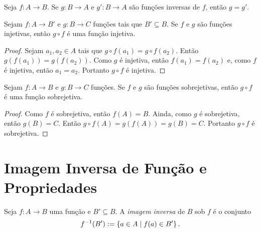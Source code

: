 \begin{prop}
	Seja $f: A \to B$. Se $g: B \to A$ e $g': B \to A$ são funções inversas de $f$, então $g=g'$.
\end{prop}
	

\begin{prop}
\label{prop:comp.func.inj}
	Sejam $f: A \to B'$ e $g: B \to C$ funções tais que $B' \subseteq B$. Se $f$ e $g$ são funções injetivas, então $g \circ f$ é uma função injetiva.
\end{prop}
\begin{proof}
	Sejam $a_1,a_2 \in A$ tais que $g \circ f(a_1)=g \circ f(a_2)$. Então $g(f(a_1))=g(f(a_2))$. Como $g$ é injetiva, então $f(a_1)=f(a_2)$ e, como $f$ é injetiva, então $a_1=a_2$. Portanto $g \circ f$ é injetiva.
\end{proof}

\begin{prop}
\label{prop:comp.func.sobr}
	Sejam $f: A \to B$ e $g: B \to C$ funções. Se $f$ e $g$ são funções sobrejetivas, então $g \circ f$ é uma função sobrejetiva.
\end{prop}
\begin{proof}
	Como $f$ é sobrejetiva, então $f(A)=B$. Ainda, como $g$ é sobrejetiva, então $g(B)=C$. Então $g \circ f(A) = g(f(A))=g(B)=C$. Portanto $g \circ f$ é sobrejetiva.
\end{proof}

\section{Imagem Inversa de Função e Propriedades}

\begin{defi}
	Seja $f: A \to B$ uma função e $B' \subseteq B$. A \emph{imagem inversa} de $B$ sob $f$ é o conjunto
	\begin{equation*}
	f^{-1}(B') := \left\{a \in A \;\middle\vert\; f(a) \in B' \right\}.
	\end{equation*}
\end{defi}

